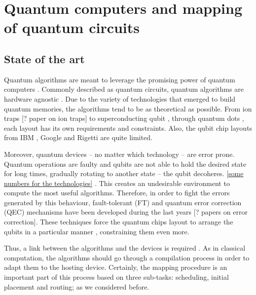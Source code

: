 
\chapter*{Quantum computers and mapping of quantum circuits}
\label{sec:org77b796a}
\section*{State of the art}
\label{sec:org07bfa1d}

Quantum algorithms are meant to leverage the promising power of quantum computers \cite{coles18:quant_algor_implem_begin}.
Commonly described as quantum circuits, quantum algorithms are hardware agnostic \cite{Nielsen_2009}.
Due to the variety of technologies that emerged to build quantum memories, the algorithms tend to be as theoretical as possible.
From ion traps [? paper on ion traps] to superconducting qubit \cite{Barends_2014}, through quantum dots \cite{Hill_2015,Li_2018}, each layout has its own requirements and constraints.
Also, the qubit chip layouts from IBM \cite{IBM_QX}, Google \cite{boixo16:charac_quant_suprem_near_term_devic} and Rigetti \cite{Sete_2016} are quite limited.

Moreover, quantum devices -- no matter which technology -- are error prone.
Quantum operations are faulty and qubits are not able to hold the desired state for long times, gradually rotating to another state -- the qubit decoheres.
\uline{[some numbers for the technologies]} \cite{O_Brien_2017}.
This creates an undesirable environment to compute the most useful algorithms.
Therefore, in order to fight the errors generated by this behaviour, fault-tolerant (FT) and quantum error correction (QEC) mechanisms have been developed during the last years \cite{Nielsen_2009} [? papers on error correction].
These techniques force the quantum chips layout to arrange the qubits in a particular manner \cite{Versluis_2017}, constraining them even more.

Thus, a link between the algorithms and the devices is required \cite{Fu_2016}.
As in classical computation, the algorithms should go through a compilation process in order to adapt them to the hosting device.
Certainly, the mapping procedure is an important part of this process based on three sub-tasks: scheduling, initial placement and routing; as we considered before.

